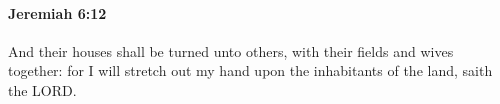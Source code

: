 
		\paragraph{Jeremiah 6:12} %
			\label{JEREMIAH-6-12}

			And their houses shall be turned unto others, with their fields and wives together: for I will stretch out my hand upon the inhabitants of the land, saith the LORD.


